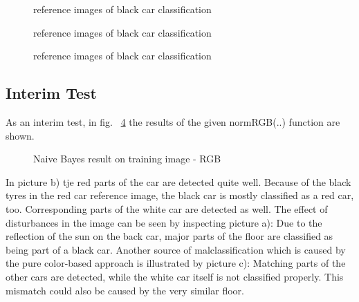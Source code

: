 \documentclass[a4paper,headings=small]{scrartcl}
\numberwithin{equation}{section} %
\numberwithin{figure}{section}   %
\newcommand{\generatedImgRoot}{../resources/img}
\newcommand{\generatedImgRootTwo}{../../../target}
\begin{document}
\begin{figure}
 \hfill
{}
\caption{reference images of black car classification}
\label{fig:label1}
\end{figure}
\begin{figure}
\hfill
{}
\caption{reference images of black car classification}
\label{fig:label2}
\end{figure}
\begin{figure}
\hfill
{}
\caption{reference images of black car classification}
\label{fig:label3}
\end{figure}

\subsection{Interim Test}
As an interim test, in fig. ~\ref{fig:label5} the results of the given normRGB(..) function are shown.

\begin{figure}
\hfill
{}
\caption{Naive Bayes result on training image - RGB}
\label{fig:label5}
\end{figure}

In picture b) tje red parts of the car are detected quite well. Because of the black tyres in the red car reference image, the black car is mostly classified as a red car, too.
Corresponding parts of the white car are detected as well.
The effect of disturbances in the image can be seen by inspecting picture a): Due to the reflection of the sun on the back car, major parts of the floor are classified as being part of a black car.
Another source of malclassification which is caused by the pure color-based approach is illustrated by picture c): Matching parts of the other cars are detected, while the white car itself is not classified properly. This mismatch could also be caused by the very similar floor.
\end{document}
